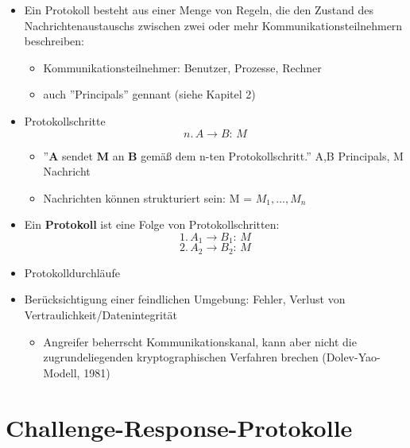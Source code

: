 \documentclass[openany]{book}
\begin{document}
\begin{itemize}
    \item Ein Protokoll besteht aus einer Menge von Regeln, die den Zustand des Nachrichtenaustauschs zwischen zwei oder mehr Kommunikationsteilnehmern beschreiben:
    \begin{itemize}
        \item Kommunikationsteilnehmer: Benutzer, Prozesse, Rechner
        \item auch ''Principals'' gennant (siehe Kapitel 2)
    \end{itemize}
    \item Protokollschritte $$n.\, A\rightarrow B: \, M$$
    \begin{itemize}
        \item ''\textbf{A} sendet \textbf{M} an \textbf{B} gemäß dem n-ten Protokollschritt.'' A,B Principals, M Nachricht
        \item Nachrichten können strukturiert sein: M = $M_1,...,M_n$
    \end{itemize}
    \item Ein \textbf{Protokoll} ist eine Folge von Protokollschritten: $$1.\, A_1\rightarrow B_1:\, M$$ $$2.\, A_2\rightarrow B_2:\, M$$ 
    \item Protokolldurchläufe
    \item Berücksichtigung einer feindlichen Umgebung: Fehler, Verlust von Vertraulichkeit/Datenintegrität
    \begin{itemize}
        \item Angreifer beherrscht Kommunikationskanal, kann aber nicht die zugrundeliegenden kryptographischen Verfahren brechen (Dolev-Yao-Modell, 1981)
    \end{itemize}
\end{itemize}

\section{Challenge-Response-Protokolle}
\end{document}
